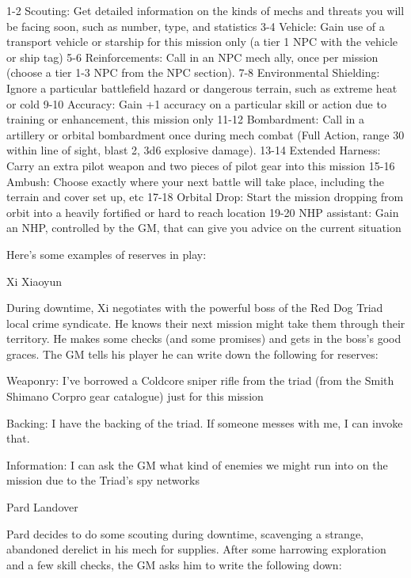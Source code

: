  1-2       Scouting: Get detailed information on the kinds of mechs and threats you will be
           facing soon, such as number, type, and statistics
 3-4       Vehicle: Gain use of a transport vehicle or starship for this mission only (a tier 1 NPC
           with the vehicle or ship tag)
 5-6       Reinforcements: Call in an NPC mech ally, once per mission (choose a tier 1-3 NPC
           from the NPC section).
 7-8       Environmental Shielding: Ignore a particular battlefield hazard or dangerous terrain,
           such as extreme heat or cold
 9-10      Accuracy: Gain +1 accuracy on a particular skill or action due to training or
           enhancement, this mission only
 11-12     Bombardment: Call in a artillery or orbital bombardment once during mech combat
           (Full Action, range 30 within line of sight, blast 2, 3d6 explosive damage).
 13-14     Extended Harness: Carry an extra pilot weapon and two pieces of pilot gear into this
           mission
 15-16     Ambush: Choose exactly where your next battle will take place, including the terrain
           and cover set up, etc
 17-18     Orbital Drop: Start the mission dropping from orbit into a heavily fortified or hard to
           reach location
 19-20     NHP assistant: Gain an NHP, controlled by the GM, that can give you advice on the
           current situation

Here’s some examples of reserves in play:


Xi Xiaoyun

During downtime, Xi negotiates with the powerful boss of the Red Dog Triad local crime
syndicate. He knows their next mission might take them through their territory. He makes some
checks (and some promises) and gets in the boss’s good graces. The GM tells his player he can
write down the following for reserves:

	        Weaponry: I’ve borrowed a Coldcore sniper rifle from the triad (from the Smith Shimano
Corpro gear catalogue) just for this mission

	        Backing: I have the backing of the triad. If someone messes with me, I can invoke that.

	        Information: I can ask the GM what kind of enemies we might run into on the mission
due to the Triad’s spy networks


Pard Landover

Pard decides to do some scouting during downtime, scavenging a strange, abandoned derelict
in his mech for supplies. After some harrowing exploration and a few skill checks, the GM asks
him to write the following down:

